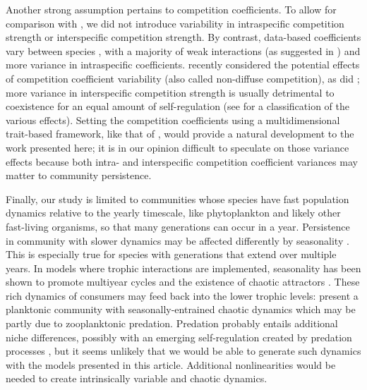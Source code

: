 \documentclass[a4paper,12pt]{article}
\begin{document}
Another strong assumption pertains to competition coefficients. To
allow for comparison with \citet{scranton_coexistence_2016}, we did
not introduce variability in intraspecific competition strength or
interspecific competition strength. By contrast, data-based coefficients
vary between species \citep{barraquand2018coastal}, with a majority
of weak interactions (as suggested in \citealp{wootton_measurement_2005})
and more variance in intraspecific coefficients. \citet{stump_multispecies_2017}
recently considered the potential effects of competition coefficient
variability (also called non-diffuse competition), as did \citet{kokkoris_variability_2002};
more variance in interspecific competition strength is usually detrimental
to coexistence for an equal amount of self-regulation (see \citet{stump_multispecies_2017}
for a classification of the various effects). Setting the competition
coefficients using a multidimensional trait-based framework, like
that of \citet{ashby_competing_2017}, would provide a natural development
to the work presented here; it is in our opinion difficult to speculate
on those variance effects because both intra- and interspecific competition
coefficient variances may matter to community persistence.

Finally, our study is limited to communities whose species have fast
population dynamics relative to the yearly timescale, like phytoplankton
and likely other fast-living organisms, so that many generations can
occur in a year. Persistence in community with slower dynamics may
be affected differently by seasonality \citep{miller_evolutionary_2017}.
This is especially true for species with generations that extend over
multiple years. In models where trophic interactions are implemented,
seasonality has been shown to promote multiyear cycles and the existence
of chaotic attractors \citep{rinaldi_multiple_1993,taylor_how_2013,tyson_seasonally_2016}.
These rich dynamics of consumers may feed back into the lower trophic
levels: \citet{dakos_interannual_2009} present a planktonic community
with seasonally-entrained chaotic dynamics which may be partly due
to zooplanktonic predation. Predation probably entails additional
niche differences, possibly with an emerging self-regulation created
by predation processes \citep{chesson_updates_2018}, but it seems
unlikely that we would be able to generate such dynamics with the
models presented in this article. Additional nonlinearities would
be needed to create intrinsically variable and chaotic dynamics.
\end{document}
